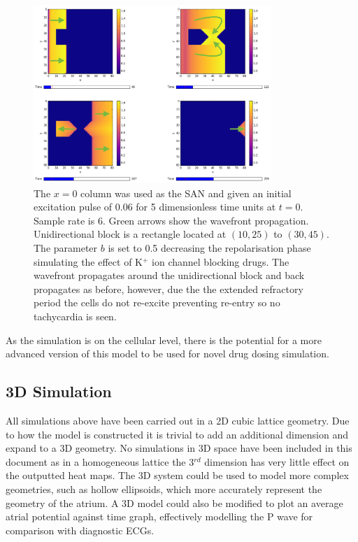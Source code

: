         \begin{figure}[H]
            \centering
            \includegraphics[width=0.8\textwidth]{images/kblock.png}
            \caption{The $x=0$ column was used as the SAN and given an initial excitation pulse of 0.06 for 5 dimensionless time units at $t=0$. Sample rate is 6. Green arrows show the wavefront propagation. Unidirectional block is a rectangle located at $(10, 25)$ to $(30, 45)$. The parameter $b$ is set to 0.5 decreasing the repolarisation phase simulating the effect of K$^+$ ion channel blocking drugs. The wavefront propagates around the unidirectional block and back propagates as before, however, due the the extended refractory period the cells do not re-excite preventing re-entry so no tachycardia is seen.}
            \label{fig5.3.3b}
        \end{figure}
        
        As the simulation is on the cellular level, there is the potential for a more advanced version of this model to be used for novel drug dosing simulation. 
        
\subsection{3D Simulation}
All simulations above have been carried out in a 2D cubic lattice geometry. Due to how the model is constructed it is trivial to add an additional dimension and expand to a 3D geometry. No simulations in 3D space have been included in this document as in a homogeneous lattice the 3$^{rd}$ dimension has very little effect on the outputted heat maps. The 3D system could be used to model more complex geometries, such as hollow ellipsoids, which more accurately represent the geometry of the atrium. A 3D model could also be modified to plot an average atrial potential against time graph, effectively modelling the P wave for comparison with diagnostic ECGs.